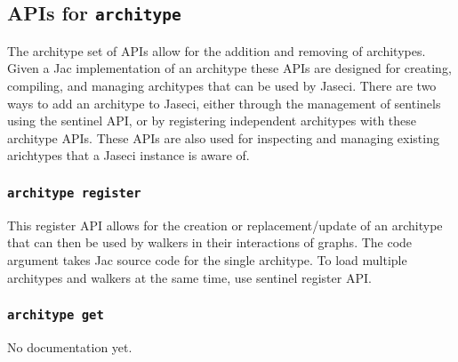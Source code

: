 \subsection{APIs for \lstinline[basicstyle=\Large\ttfamily]$architype$}

\par
The architype set of APIs allow for the addition and removing of
architypes. Given a Jac implementation of an architype these APIs are
designed for creating, compiling, and managing architypes that can be
used by Jaseci. There are two ways to add an architype to Jaseci, either
through the management of sentinels using the sentinel API, or by
registering independent architypes with these architype APIs. These
APIs are also used for inspecting and managing existing arichtypes that
a Jaseci instance is aware of.

\subsubsection{\lstinline[basicstyle=\Large\ttfamily]$architype register$}

{This register API allows for the creation or replacement/update of
an architype that can then be used by walkers in their interactions
of graphs. The code argument takes Jac source code for the single
architype. To load multiple architypes and walkers at the same time,
use sentinel register API.\vspace{4mm}\par
{}}
\subsubsection{\lstinline[basicstyle=\Large\ttfamily]$architype get$}

{No documentation yet.\vspace{4mm}\par
{}}
